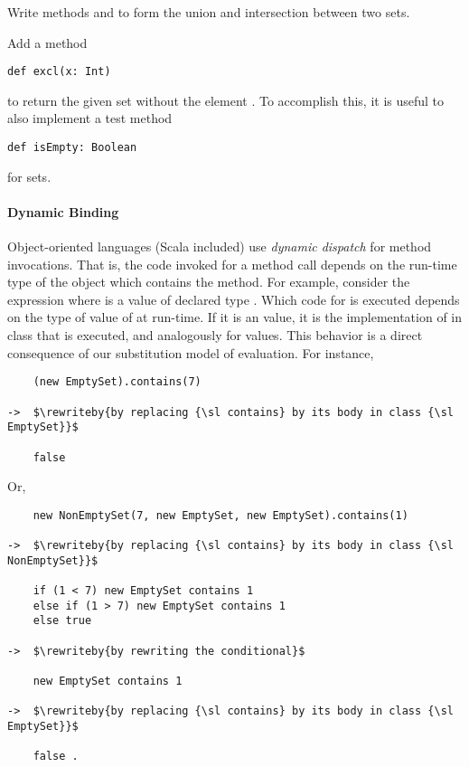 \begin{exercise} Write methods  and  to form
the union and intersection between two sets.
\end{exercise}

\begin{exercise} Add a method 
\begin{lstlisting}
def excl(x: Int)
\end{lstlisting}
to return the given set without the element . To accomplish this,
it is useful to also implement a test method
\begin{lstlisting}
def isEmpty: Boolean
\end{lstlisting}
for sets.
\end{exercise}

\paragraph{Dynamic Binding}

Object-oriented languages (Scala included) use \emph{dynamic dispatch}
for method invocations.  That is, the code invoked for a method call
depends on the run-time type of the object which contains the method.
For example, consider the expression  where
 is a value of declared type . Which code for
 is executed depends on the type of value of  at run-time.
If it is an  value, it is the implementation of  in class  that is executed, and analogously for  values. 
This behavior is a direct consequence of our substitution model of evaluation.
For instance,
\begin{lstlisting}
    (new EmptySet).contains(7) 

->  $\rewriteby{by replacing {\sl contains} by its body in class {\sl EmptySet}}$

    false
\end{lstlisting}
Or,
\begin{lstlisting}
    new NonEmptySet(7, new EmptySet, new EmptySet).contains(1)

->  $\rewriteby{by replacing {\sl contains} by its body in class {\sl NonEmptySet}}$

    if (1 < 7) new EmptySet contains 1
    else if (1 > 7) new EmptySet contains 1
    else true

->  $\rewriteby{by rewriting the conditional}$

    new EmptySet contains 1

->  $\rewriteby{by replacing {\sl contains} by its body in class {\sl EmptySet}}$

    false .
\end{lstlisting}


